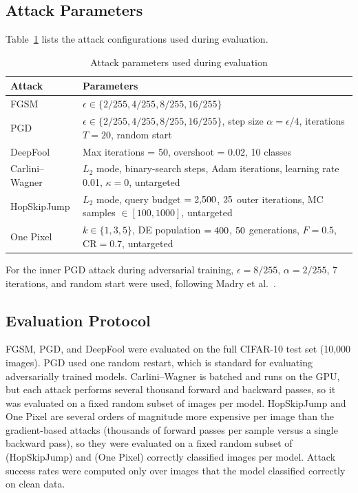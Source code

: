 \subsection{Attack Parameters}

Table~\ref{tab:attack_params} lists the attack configurations used during evaluation.

\begin{table}[htbp]
    \centering
    \caption{Attack parameters used during evaluation}
    \label{tab:attack_params}
    \begin{tabular}{lp{8cm}}
        \toprule
        \textbf{Attack} & \textbf{Parameters} \\
        \midrule
        FGSM & $\epsilon \in \{2/255, 4/255, 8/255, 16/255\}$ \\
        PGD & $\epsilon \in \{2/255, 4/255, 8/255, 16/255\}$, step size $\alpha = \epsilon/4$, iterations $T = 20$, random start \\
        DeepFool & Max iterations = 50, overshoot = 0.02, 10 classes \\
        Carlini--Wagner & $L_2$ mode, \CWS{} binary-search steps, \CWI{} Adam iterations, learning rate 0.01, $\kappa = 0$, untargeted \\
        HopSkipJump & $L_2$ mode, query budget $= 2{,}500{}$, $25{}$ outer iterations, MC samples $\in [100, 1000]$, untargeted \\
        One Pixel & $k \in \{1, 3, 5\}$, DE population $= 400{}$, $50{}$ generations, $F = 0.5$, $\mathrm{CR} = 0.7$, untargeted \\
        \bottomrule
    \end{tabular}
\end{table}

For the inner PGD attack during adversarial training, $\epsilon = 8/255$, $\alpha = 2/255$, 7 iterations, and random start were used, following Madry et al.~\cite{madry2018towards}.

\subsection{Evaluation Protocol}

FGSM, PGD, and DeepFool were evaluated on the full CIFAR-10 test set (10,000 images). PGD used one random restart, which is standard for evaluating adversarially trained models. Carlini--Wagner is batched and runs on the GPU, but each attack performs several thousand forward and backward passes, so it was evaluated on a fixed random subset of \CWN{} images per model. HopSkipJump and One Pixel are several orders of magnitude more expensive per image than the gradient-based attacks (thousands of forward passes per sample versus a single backward pass), so they were evaluated on a fixed random subset of \HSJN{} (HopSkipJump) and \OPN{} (One Pixel) correctly classified images per model. Attack success rates were computed only over images that the model classified correctly on clean data.

